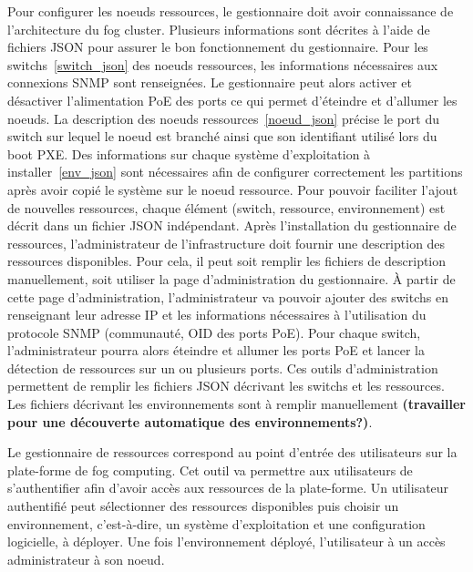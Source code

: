\documentclass[letterpaper, 10 pt, conference]{ieeeconf}
\begin{document}
Pour configurer les noeuds ressources, le gestionnaire doit avoir connaissance de l'architecture du fog cluster. Plusieurs informations sont décrites à l'aide de fichiers JSON pour assurer le bon fonctionnement du gestionnaire. Pour les switchs~\ref{switch_json} des noeuds ressources, les informations nécessaires aux connexions SNMP sont renseignées. Le gestionnaire peut alors activer et désactiver l'alimentation PoE des ports ce qui permet d'éteindre et d'allumer les noeuds. La description des noeuds ressources~\ref{noeud_json} précise le port du switch sur lequel le noeud est branché ainsi que son identifiant utilisé lors du boot PXE. Des informations sur chaque système d'exploitation à installer~\ref{env_json} sont nécessaires afin de configurer correctement les partitions après avoir copié le système sur le noeud ressource.
Pour pouvoir faciliter l'ajout de nouvelles ressources, chaque élément (switch, ressource, environnement) est décrit dans un fichier JSON indépendant. Après l'installation du gestionnaire de ressources, l'administrateur de l'infrastructure doit fournir une description des ressources disponibles. Pour cela, il peut soit remplir les fichiers de description manuellement, soit utiliser la page d'administration du gestionnaire. À partir de cette page d'administration, l'administrateur va pouvoir ajouter des switchs en renseignant leur adresse IP et les informations nécessaires à l'utilisation du protocole SNMP (communauté, OID des ports PoE). Pour chaque switch, l'administrateur pourra alors éteindre et allumer les ports PoE et lancer la détection de ressources sur un ou plusieurs ports. Ces outils d'administration permettent de remplir les fichiers JSON décrivant les switchs et les ressources. Les fichiers décrivant les environnements sont à remplir manuellement \textbf{(travailler pour une découverte automatique des environnements?)}.

Le gestionnaire de ressources correspond au point d'entrée des utilisateurs sur la plate-forme de fog computing. Cet outil va permettre aux utilisateurs de s'authentifier afin d'avoir accès aux ressources de la plate-forme. Un utilisateur authentifié peut sélectionner des ressources disponibles puis choisir un environnement, c'est-à-dire, un système d'exploitation et une configuration logicielle, à déployer. Une fois l'environnement déployé, l'utilisateur à un accès administrateur à son noeud.
\end{document}
